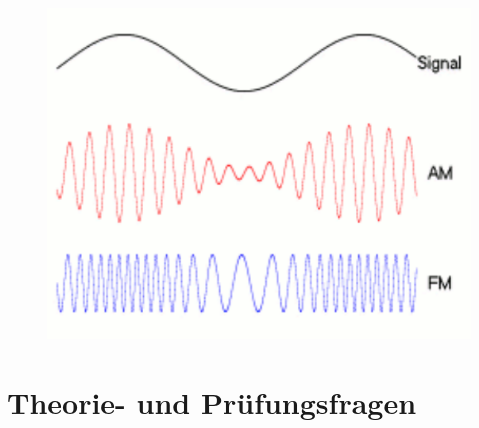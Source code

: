 \begin{figure}
 \vspace{-6cm}
  \includegraphics[scale=0.6]{Modulation/Bilder/Amfm3-en-de.pdf}
 \vspace{-6cm}
\end{figure}

\section*{Theorie- und Prüfungsfragen}


